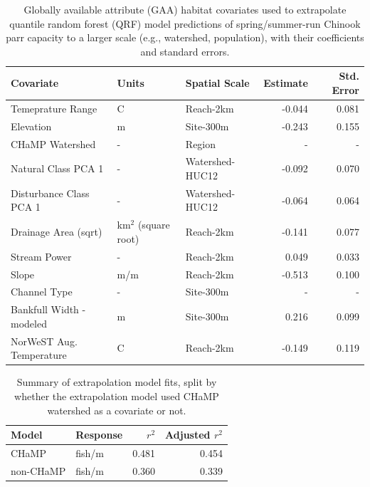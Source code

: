 \documentclass[
  12pt,
]{article}
\begin{document}
\newpage

\begin{table}[!h]

\caption{\label{tab:gaa-covars}Globally available attribute (GAA) habitat covariates used to extrapolate quantile random forest (QRF) model predictions of spring/summer-run Chinook parr capacity to a larger scale (e.g., watershed, population), with their coefficients and standard errors.}
\centering
\fontsize{10}{12}\selectfont
\begin{tabular}[t]{lllrr}
\toprule
Covariate & Units & Spatial Scale & Estimate & Std. Error\\
\midrule
Temeprature Range & C & Reach-2km & -0.044 & 0.081\\
Elevation & m & Site-300m & -0.243 & 0.155\\
CHaMP Watershed & - & Region & - & -\\
Natural Class PCA 1 & - & Watershed-HUC12 & -0.092 & 0.070\\
Disturbance Class PCA 1 & - & Watershed-HUC12 & -0.064 & 0.064\\
Drainage Area (sqrt) & km$^2$ (square root) & Reach-2km & -0.141 & 0.077\\
Stream Power & - & Reach-2km & 0.049 & 0.033\\
Slope & m/m & Reach-2km & -0.513 & 0.100\\
Channel Type & - & Site-300m & - & -\\
Bankfull Width - modeled & m & Site-300m & 0.216 & 0.099\\
NorWeST Aug. Temperature & C & Reach-2km & -0.149 & 0.119\\
\bottomrule
\end{tabular}
\end{table}

\newpage

\begin{table}[!h]

\caption{\label{tab:extrap-r2-table}Summary of extrapolation model fits, split by whether the extrapolation model used CHaMP watershed as a covariate or not.}
\centering
\fontsize{10}{12}\selectfont
\begin{tabular}[t]{llrr}
\toprule
Model & Response & $r^2$ & Adjusted $r^2$\\
\midrule
CHaMP & fish/m & 0.481 & 0.454\\
non-CHaMP & fish/m & 0.360 & 0.339\\
\bottomrule
\end{tabular}
\end{table}
\end{document}
